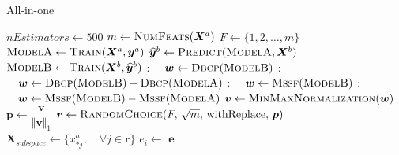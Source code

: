 \documentclass{article}
\begin{document}
\begin{algorithm}
    \caption{All-in-one}
    \begin{algorithmic}[1]
            \State $nEstimators \gets 500$
            \State $m \gets \Call{NumFeats}{\bm{X}^a}$
            \State $F \gets \{1,2,\dots,m\}$
            \State $\textsc{ModelA} \gets \Call{Train}{\bm{X}^a,\bm{y}^a}$
            \State $\widehat{\bm{y}}^b \gets \Call{Predict}{\textsc{ModelA},\bm{X}^b}$
            \State $\textsc{ModelB} \gets \Call{Train}{\bm{X}^b,\widehat{\bm{y}}^b}$
                : $\quad \bm{w} \gets \Call{Dbcp}{\textsc{ModelB}}$
                : $\quad \bm{w} \gets \Call{Dbcp}{\textsc{ModelB}} - \Call{Dbcp}{\textsc{ModelA}}$
                : $\quad \bm{w} \gets \Call{Mssf}{\textsc{ModelB}}$
                : $\quad \bm{w} \gets \Call{Mssf}{\textsc{ModelB}}-\Call{Mssf}{\textsc{ModelA}}$
            \EndCase
            \State $\bm{v} \gets \Call{MinMaxNormalization}{\bm{w}}$ 
            \State $\bm{p} \gets \dfrac{\bm{v}}{\big\Vert\bm{v}\big\Vert_1}$ 
                \State $\bm{r} \gets \Call{RandomChoice}{F,\, \sqrt{m},\, \text{withReplace},\, \bm{p}}$
                \State $\bm{X}_{subspace} \gets \{{x}_{*j}^{a}, \quad \forall j \in \bm{r}\}$
                \State $e_i \gets$ 
            \EndFor
		\State \Return $\bm{e}$
        \EndFunction
    \end{algorithmic}
\end{algorithm}
\end{document}

